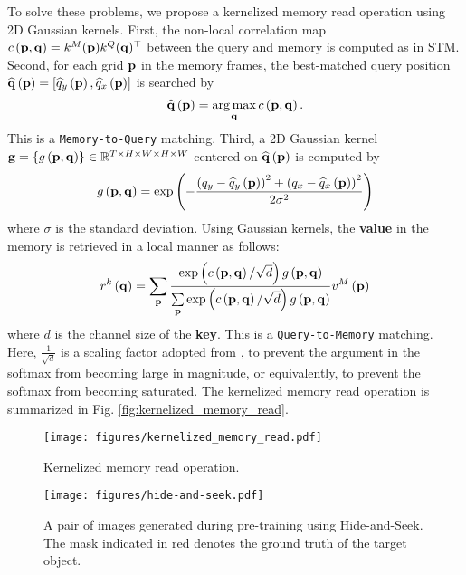 \documentclass[runningheads]{llncs}
\begin{document}
To solve these problems, we propose a kernelized memory read operation using 2D Gaussian kernels. First, the non-local correlation map $c \left( {\bf{p}} , {\bf{q}} \right) = {{{{k}}^{M}}({\bf{p}})} {k^Q}({\bf{q}})^\top$ between the query and memory is computed as in STM. Second, for each grid $\bf{p}$ in the memory frames, the best-matched query position ${\widehat{\bf{q}}}\left({\bf{p}}\right) = \left[ {{{\widehat q}_y}}\left({\bf{p}}\right), {{{\widehat q}_x}}\left({\bf{p}}\right) \right]$ is searched by
\begin{equation}
\widehat {\bf{q}}\left( {\bf{p}} \right) = \mathop {\arg\max }\limits_{\bf{q}} c\left( {{\bf{p}},{\bf{q}}} \right) .
\label{eq3}
\end{equation}
This is a \texttt{Memory-to-Query} matching. Third, a 2D Gaussian kernel ${\bf{g}} = \left\{g\left({\bf{p}} , {\bf{q}}\right)\right\} \in {\mathbb{R}^{T \times H \times W \times H \times W}}$ centered on $\widehat {\bf{q}}\left( {\bf{p}} \right) $ is computed by
\begin{equation}
g\left( {{\bf{p}},{\bf{q}}} \right) = \exp \left( { - \frac{{{{\left( {{q_y} - {{\widehat q}_y}\left( {\bf{p}} \right)} \right)}^2} + {{\left( {{q_x} - {{\widehat q}_x}\left( {\bf{p}} \right)} \right)}^2}}}{{2{\sigma ^2}}}} \right)
\label{eq4}
\end{equation}
where $\sigma$ is the standard deviation. Using Gaussian kernels, the \textbf{value} in the memory is retrieved in a local manner as follows:
\begin{equation}
{r^k}\left( {\bf{q}} \right) = \sum\limits_{\bf{p}} {\frac{{\exp \left( {c\left( {{\bf{p}},{\bf{q}}} \right)/\sqrt d } \right)g\left( {{\bf{p}},{\bf{q}}} \right)}}{{\sum\limits_{\bf{p}} {\exp \left( {c\left( {{\bf{p}},{\bf{q}}} \right)/\sqrt d } \right)g\left( {{\bf{p}},{\bf{q}}} \right)} }}} {v^M}\left( {\bf{p}} \right)
\label{eq5}
\end{equation}
where $d$ is the channel size of the \textbf{key}. This is a \texttt{Query-to-Memory} matching. Here, $\frac{1}{\sqrt{d}}$ is a scaling factor adopted from \cite{vaswani2017attention}, to prevent the argument in the softmax from becoming large in magnitude, or equivalently, to prevent the softmax from becoming saturated. The kernelized memory read operation is summarized in Fig. \ref{fig:kernelized_memory_read}.


\begin{figure}[t]
\centering
\begin{minipage}[]{0.5\linewidth}
\texttt{[image: figures/kernelized\_memory\_read.pdf]}
\caption{Kernelized memory read operation.}
\label{fig:kernelized_memory_read}
\end{minipage}\hfill \begin{minipage}[]{0.45\linewidth}
\texttt{[image: figures/hide-and-seek.pdf]}
\caption{A pair of images generated during pre-training using Hide-and-Seek. The mask indicated in red denotes the ground truth of the target object.}
\label{fig:hide-and-seek}
\end{minipage} 
\end{figure}
\end{document}
